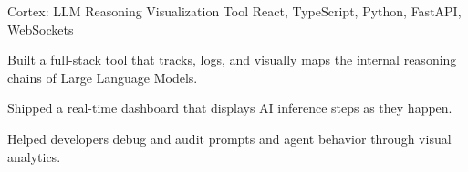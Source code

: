 \resumeSubheading
  {Cortex: LLM Reasoning Visualization Tool}{}
  {React, TypeScript, Python, FastAPI, WebSockets}{}
  \resumeItemListStart
    \item \small{Built a full-stack tool that tracks, logs, and visually maps the internal reasoning chains of Large Language Models.}
    \item \small{Shipped a real-time dashboard that displays AI inference steps as they happen.}
    \item \small{Helped developers debug and audit prompts and agent behavior through visual analytics.}
  \resumeItemListEnd
